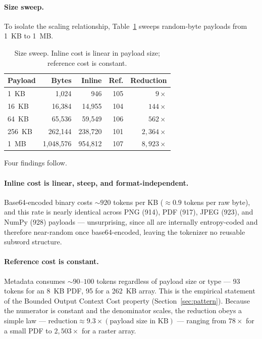 \documentclass[11pt]{article}
\begin{document}
\paragraph{Size sweep.} To isolate the scaling relationship, Table~\ref{tab:sweep} sweeps random-byte payloads from 1~KB to 1~MB.

\begin{table}[htbp]\centering
\caption{Size sweep. Inline cost is linear in payload size; reference cost is constant.}\label{tab:sweep}
\begin{tabular}{lrrrr}
\toprule
Payload & Bytes & Inline & Ref. & Reduction \\
\midrule
1~KB   & 1{,}024     & 946     & 105 & $9\times$    \\
16~KB  & 16{,}384    & 14{,}955  & 104 & $144\times$  \\
64~KB  & 65{,}536    & 59{,}549  & 106 & $562\times$  \\
256~KB & 262{,}144   & 238{,}720 & 101 & $2{,}364\times$ \\
1~MB   & 1{,}048{,}576 & 954{,}812 & 107 & $8{,}923\times$ \\
\bottomrule
\end{tabular}
\end{table}

Four findings follow.

\paragraph{Inline cost is linear, steep, and format-independent.} Base64-encoded binary costs ${\sim}920$ tokens per KB ($\approx 0.9$ tokens per raw byte), and this rate is nearly identical across PNG (914), PDF (917), JPEG (923), and NumPy (928) payloads --- unsurprising, since all are internally entropy-coded and therefore near-random once base64-encoded, leaving the tokenizer no reusable subword structure.

\paragraph{Reference cost is constant.} Metadata consumes ${\sim}90$--$100$ tokens regardless of payload size or type --- 93 tokens for an 8~KB PDF, 95 for a 262~KB array. This is the empirical statement of the Bounded Output Context Cost property (Section~\ref{sec:pattern}). Because the numerator is constant and the denominator scales, the reduction obeys a simple law --- $\text{reduction} \approx 9.3 \times (\text{payload size in KB})$ --- ranging from $78\times$ for a small PDF to $2{,}503\times$ for a raster array.
\end{document}
